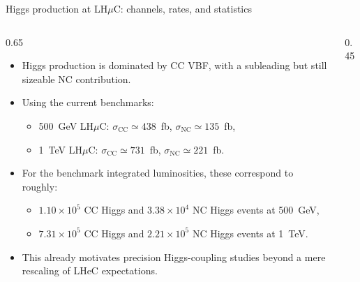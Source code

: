 \documentclass[aspectratio=1610,english]{beamer}
\newcommand{\LHCmu}{LH$\mu$C}
\begin{document}
\begin{frame}{Higgs production at \LHCmu: channels, rates, and statistics}
	
	
\begin{columns}%
		
\begin{column}{0.65\textwidth}
\begin{itemize}
\justifying
\small
\item Higgs production is dominated by CC VBF, with a subleading but still sizeable NC contribution.
				
\item Using the current benchmarks:
\begin{itemize}
\justifying
\small
\item 500~GeV \LHCmu: $\sigma_{\mathrm{CC}}\simeq 438$~fb, $\sigma_{\mathrm{NC}}\simeq 135$~fb,
\item 1~TeV \LHCmu: $\sigma_{\mathrm{CC}}\simeq 731$~fb, $\sigma_{\mathrm{NC}}\simeq 221$~fb.
\end{itemize}
				
\item For the benchmark integrated luminosities, these correspond to roughly:
\begin{itemize}
\justifying
\small
\item $1.10\times10^5$ CC Higgs and $3.38\times10^4$ NC Higgs events at 500~GeV,
\item $7.31\times10^5$ CC Higgs and $2.21\times10^5$ NC Higgs events at 1~TeV.
\end{itemize}
				
\item This already motivates precision Higgs-coupling studies beyond a mere rescaling of LHeC expectations.
\end{itemize}
\end{column}
		
\begin{column}{0.45\textwidth}
			
\begin{columns}[T,onlytextwidth]
				

\end{columns}
\end{column}
\end{columns}
\end{frame}
\end{document}
